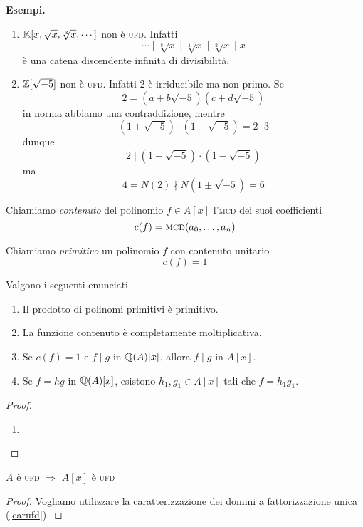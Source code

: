 \begin{multicols}{2}
\textbf{Esempi.}
\begin{enumerate}
	\item $ \mathbb{K} [x, \sqrt{x}, \sqrt[3]{x}, \cdots ] $ non è \textsc{ufd}. Infatti 
	\[ \cdots \mid \sqrt[8]{x} \mid \sqrt[4]{x} \mid \sqrt[2]{x} \mid x \]
	è una catena discendente infinita di divisibilità.
	
	\item $ \mathbb{Z}[\sqrt{-5}] $ non è \textsc{ufd}. Infatti $ 2 $ è irriducibile ma non primo.
	Se \[ 2 = (a+b\sqrt{-5})(c + d\sqrt{-5}) \] in norma abbiamo una contraddizione, mentre
	\[ (1 + \sqrt{-5})\cdot (1 - \sqrt{-5}) = 2 \cdot 3 \]
	dunque \[ 2 \mid (1 + \sqrt{-5})\cdot (1 - \sqrt{-5})  \] ma
	\[ 4 = N(2) \nmid N(1 \pm \sqrt{-5}) = 6 \]
	
\end{enumerate}

\begin{definition}
	Chiamiamo \emph{contenuto} del polinomio $ f \in A[x] $ l'\textsc{mcd} dei suoi coefficienti
	\[ c(f) = \textsc{mcd}(a_0, \dots , a_n) \]
\end{definition}

\begin{definition}
	Chiamiamo \emph{primitivo} un polinomio $ f $ con contenuto unitario
	\[ c(f) = 1 \]
\end{definition}

\begin{theorem}\label{LemmaGauss}
	Valgono i seguenti enunciati
	\begin{enumerate}
	\item Il prodotto di polinomi primitivi è primitivo.
	\item La funzione contenuto è completamente moltiplicativa.
	\item Se $ c(f) = 1 $ e $ f \mid g $ in $ \mathbb{Q}(A)[x] $, allora $ f \mid g $ in $ A[x] $.
	\item Se $ f = hg $ in $ \mathbb{Q}(A)[x] $, esistono $ h_1, g_1 \in A[x] $ tali che $ f = h_1g_1 $.
	\end{enumerate}
	
\end{theorem}
\begin{proof}
	
\begin{enumerate}
	\item  
\end{enumerate}
\end{proof}

\begin{theorem}
	$ A $ è \textsc{ufd} $ \Rightarrow $ $ A[x] $ è \textsc{ufd}
\end{theorem}
\begin{proof}
	Vogliamo utilizzare la caratterizzazione dei domini a fattorizzazione unica (\ref{carufd}).
	

\end{proof}
\end{multicols}
